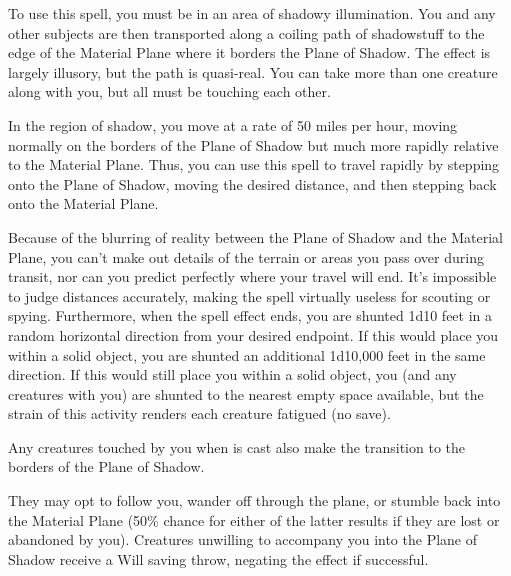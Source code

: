 \begin{spelleffect}
To use this spell, you must be in an area of shadowy illumination. You and any other subjects are then transported along a coiling path of shadowstuff to the edge of the Material Plane where it borders the Plane of Shadow. The effect is largely illusory, but the path is quasi-real. You can take more than one creature along with you, but all must be touching each other.
\par In the region of shadow, you move at a rate of 50 miles per hour, moving normally on the borders of the Plane of Shadow but much more rapidly relative to the Material Plane. Thus, you can use this spell to travel rapidly by stepping onto the Plane of Shadow, moving the desired distance, and then stepping back onto the Material Plane.
\par Because of the blurring of reality between the Plane of Shadow and the Material Plane, you can't make out details of the terrain or areas you pass over during transit, nor can you predict perfectly where your travel will end. It's impossible to judge distances accurately, making the spell virtually useless for scouting or spying. Furthermore, when the spell effect ends, you are shunted 1d10 feet in a random horizontal direction from your desired endpoint. If this would place you within a solid object, you are shunted an additional 1d10,000 feet in the same direction. If this would still place you within a solid object, you (and any creatures with you) are shunted to the nearest empty space available, but the strain of this activity renders each creature fatigued (no save).

\par Any creatures touched by you when  is cast also make the transition to the borders of the Plane of Shadow.
\par They may opt to follow you, wander off through the plane, or stumble back into the Material Plane (50\% chance for either of the latter results if they are lost or abandoned by you). Creatures unwilling to accompany you into the Plane of Shadow receive a Will saving throw, negating the effect if successful.
\end{spelleffect}

